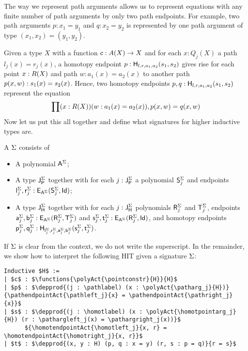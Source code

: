 The way we represent path arguments allows us to represent equations with any finite number of path arguments by only two path endpoints.
For example, two path arguments $p : x_1 = y_1$ and $q : x_2 = y_2$ is represented by one path argument of type $(x_1, x_2) = (y_1, y_2)$.

Given a type $X$ with a function $c : \polyAct{A}{X} \rightarrow X$ and for each $x : Q_j(X)$ a path $l_j(x) = r_j(x)$,
a homotopy endpoint $p : \homotendpoint{l}{r}{a_1}{a_2}{s_1}{s_2}$ gives rise for each point $x : \polyAct{R}{X}$ and path $w : a_1(x) = a_2(x)$
to another path $\homotendpointAct{p}{x, w} : s_1(x) = s_2(x)$.
Hence, two homotopy endpoints $p, q : \homotendpoint{l}{r}{a_1}{a_2}{s_1}{s_2}$ represent the equation
\[
\depprod{(x : \polyAct{R}{X}) (w : a_1(x) = a_2(x))}{\homotendpointAct{p}{x, w} = \homotendpointAct{q}{x, w}}
\]
Now let us put this all together and define what signatures for higher inductive types are.

\begin{definition}
\label{def:signature}
A  $\sign$ consists of
\begin{itemize}
	\item A polynomial $\pointconstr[\sign]$;
	\item A type $\pathlabel[\sign]$ together with for each $j : \pathlabel[\sign]$ a polynomial $\patharg[\sign]_j$ and endpoints $\pathleft[\sign]_j, \pathright[\sign]_j : \pathendpoint{\pointconstr[\sign]}{\patharg[\sign]_j}{\idP}$;
	\item A type $\homotlabel[\sign]$ together with for each $j : \homotlabel[\sign]$ polynomials $\homotpointarg[\sign]_j$ and $\homotpathtarg[\sign]_j$,
	endpoints $\pathargleft[\sign]_j, \pathargright[\sign]_j : \pathendpoint{\pointconstr[\sign]}{\homotpointarg[\sign]_j}{\homotpathtarg[\sign]_j}$
	and $\homotpathleft[\sign]_j, \homotpathright[\sign]_j : \pathendpoint{\pointconstr[\sign]}{\homotpointarg[\sign]_j}{\idP}$,
	and homotopy endpoints $\homotleft[\sign]_j, \homotright[\sign]_j : \homotendpoint{\pathleft[\sign]_j}{\pathright[\sign]_j}{\pathargleft[\sign]_j}{\pathargright[\sign]_j}{\homotpathleft[\sign]_j}{\homotpathright[\sign]_j}$.
\end{itemize}
\end{definition}

If $\sign$ is clear from the context, we do not write the superscript.
In the remainder, we show how to interpret the following HIT given a signature $\sign$:

\begin{lstlisting}[mathescape=true]
Inductive $H$ :=
| $c$ : $\functions{\polyAct{\pointconstr}{H}}{H}$
| $p$ : $\depprod{(j : \pathlabel) (x : \polyAct{\patharg_j}{H})}{\pathendpointAct{\pathleft_j}{x} = \pathendpointAct{\pathright_j}{x}}$
| $s$ : $\depprod{(j : \homotlabel) (x : \polyAct{\homotpointarg_j}{H}) (r : \pathargleft_j(x) = \pathargright_j(x))}$
      ${\homotendpointAct{\homotleft_j}{x, r} = \homotendpointAct{\homotright_j}{x, r}}$
| $t$ : $\depprod{(x, y : H) (p, q : x = y) (r, s : p = q)}{r = s}$
\end{lstlisting}

